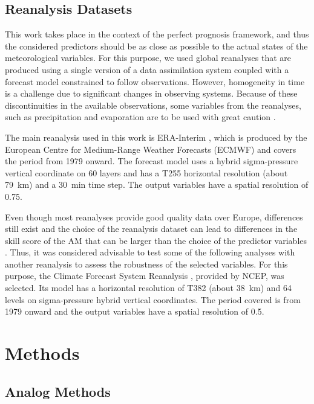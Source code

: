 \documentclass[draft]{agujournal2019}
\begin{document}
\subsection{Reanalysis Datasets}
\label{reanalyses}

This work takes place in the context of the perfect prognosis framework, and thus the considered predictors should be as close as possible to the actual states of the meteorological variables. For this purpose, we used global reanalyses that are produced using a single version of a data assimilation system coupled with a forecast model constrained to follow observations. However, homogeneity in time is a challenge due to significant changes in observing systems. Because of these discontinuities in the available observations, some variables from the reanalyses, such as precipitation and evaporation are to be used with great caution \cite{Kobayashi2015}.

The main reanalysis used in this work is ERA-Interim \cite<ERA-I,>{Dee2011a}, which is produced by the European Centre for Medium-Range Weather Forecasts (ECMWF) and covers the period from 1979 onward. The forecast model uses a hybrid sigma-pressure vertical coordinate on 60 layers and has a T255 horizontal resolution (about 79~km) and a 30~min time step. The output variables have a spatial resolution of 0.75\degree.

Even though most reanalyses provide good quality data over Europe, differences still exist and the choice of the reanalysis dataset can lead to differences in the skill score of the AM that can be larger than the choice of the predictor variables \cite{Horton2018b}. Thus, it was considered advisable to test some of the following analyses with another reanalysis to assess the robustness of the selected variables. For this purpose, the Climate Forecast System Reanalysis \cite<CFSR,>{Saha2010a}, provided by NCEP, was selected. Its model has a horizontal resolution of T382 (about 38~km) and 64 levels on sigma-pressure hybrid vertical coordinates. The period covered is from 1979 onward and the output variables have a spatial resolution of 0.5\degree.


\section{Methods}
\label{methods}

\subsection{Analog Methods}
\label{ams}
\end{document}
